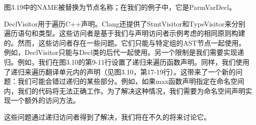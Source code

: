 图3.19中的NAME被替换为节点名称；在我们的例子中，它是ParmVarDecl。

DeclVisitor用于遍历C++声明。Clang还提供了StmtVisitor和TypeVisitor来分别遍历语句和类型。这些访问者是基于我们与声明访问者示例考虑的相同原则构建的。然而，这些访问者存在一些问题。它们只能与特定组的AST节点一起使用。例如，DeclVisitor只能与Decl类的后代一起使用。另一个限制是我们需要实现递归。例如，我们在图3.10的第9-11行设置了递归来遍历函数声明。同样，我们使用了递归来遍历翻译单元内的声明（见图3.10，第17-19行）。这带来了一个新的问题：我们可能会错过递归的某些部分。例如，如果max函数声明指定在命名空间内，我们的代码将无法正确工作。为了解决这种情况，我们需要为命名空间声明实现一个额外的访问方法。

这些问题通过递归访问者得到了解决，我们将在不久的将来讨论它。



















